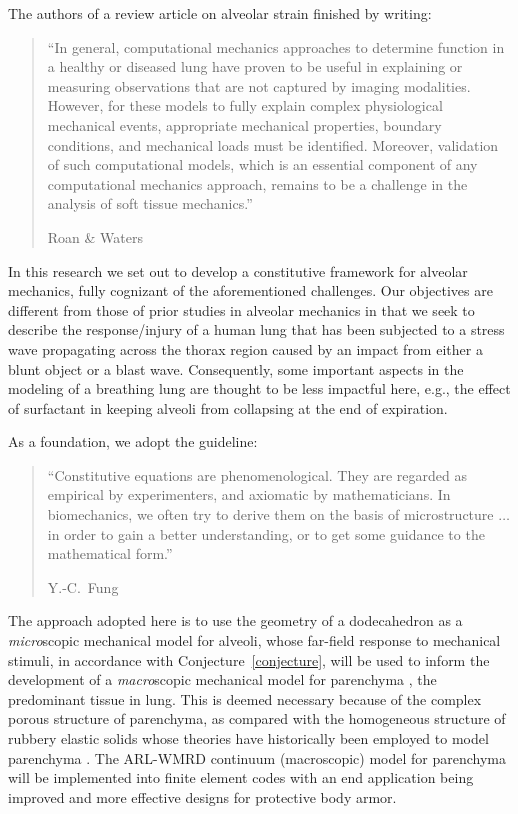 The authors of a review article on alveolar strain finished by writing:
\begin{quotation}
    \noindent\small ``In general, computational mechanics approaches to determine function in a healthy or diseased lung have proven to be useful in explaining or measuring observations that are not captured by imaging modalities. However, for these models to fully explain complex physiological mechanical events, appropriate mechanical properties, boundary conditions, and mechanical loads must be identified. Moreover, validation of such computational models, which is an essential component of any computational mechanics approach, remains to be a challenge in the analysis of soft tissue mechanics.''
    
    \nopagebreak
    \mbox{} \hfill Roan \& Waters \cite[pg.~L633]{RoanWaters11} \normalsize
\end{quotation}
In this research we set out to develop a constitutive framework for alveolar mechanics, fully cognizant of the aforementioned challenges.  Our objectives are different from those of prior studies in alveolar mechanics in that we seek to describe the response\slash injury of a human lung that has been subjected to a stress wave propagating across the thorax region caused by an impact from either a blunt object or a blast wave.  Consequently, some important aspects in the modeling of a breathing lung are thought to be less impactful here, e.g., the effect of surfactant in keeping alveoli from collapsing at the end of expiration.

As a foundation, we adopt the guideline:
\begin{quotation}
	\noindent\small ``Constitutive equations are phenomenological. They are regarded as empirical by experimenters, and axiomatic by mathematicians.  In biomechanics, we often try to derive them on the basis of micro\-structure $\ldots$ in order to gain a better understanding, or to get some guidance to the mathematical form.''
	
	\nopagebreak
	\mbox{} \hfill Y.-C.~Fung \cite[pg.~431]{Fung90} \normalsize
\end{quotation}
The approach adopted here is to use the geometry of a dodecahedron as a \textit{micro\/}scopic mechanical model for alveoli, whose far-field response to mechanical stimuli, in accordance with Conjecture~\ref{conjecture}, will be used to inform the development of a \textit{macro\/}scopic mechanical model for parenchyma \cite{ClaytonFreed19}, the predominant tissue in lung.  This is deemed necessary because of the complex porous structure of parenchyma, as compared with the homo\-geneous structure of rubbery elastic solids whose theories have historically been employed to model parenchyma \cite{Fung75,Fungetal78,Vawteretal79,Fung88}.  The ARL-WMRD continuum (macroscopic) model for parenchyma \cite{ClaytonFreed19} will be implemented into finite element codes with an end application being improved and more effective designs for protective body armor. 

